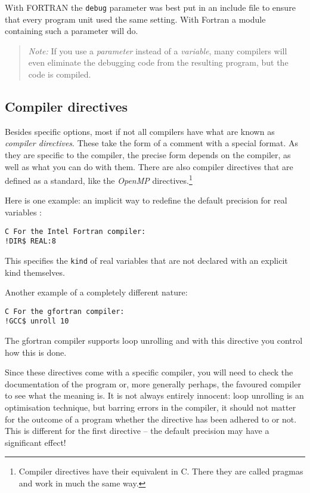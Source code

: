 With FORTRAN the \verb+debug+ parameter was best put in an include file to ensure that every program unit
used the same setting. With Fortran a module containing such a parameter will do.

\begin{quote}
\emph{Note:} If you use a \emph{parameter} instead of a \emph{variable}, many compilers will even eliminate
the debugging code from the resulting program, but the code is compiled.
\end{quote}


\subsection{Compiler directives}
Besides specific options, most if not all compilers have what are known as \emph{compiler directives}. These
take the form of a comment with a special format. As they are specific to the compiler, the precise form
depends on the compiler, as well as what you can do with them. There are also compiler directives that
are defined as a standard, like the \emph{OpenMP} directives.\footnote{Compiler directives have their
equivalent in C. There they are called pragmas and work in much the same way.}

Here is one example: an implicit way to redefine the default precision for real variables \cite{IntelRealDirective}:

\begin{verbatim}
C For the Intel Fortran compiler:
!DIR$ REAL:8
\end{verbatim}

This specifies the \verb+kind+ of real variables that are not declared with an explicit kind themselves.

Another example of a completely different nature:

\begin{verbatim}
C For the gfortran compiler:
!GCC$ unroll 10
\end{verbatim}

The gfortran compiler supports loop unrolling and with this directive you control how this is done.

Since these directives come with a specific compiler, you will need to check the documentation of
the program or, more generally perhaps, the favoured compiler to see what the meaning is. It is not
always entirely innocent: loop unrolling is an optimisation technique, but barring errors in the
compiler, it should not matter for the outcome of a program whether the directive has been adhered
to or not. This is different for the first directive -- the default precision may have a significant
effect!


